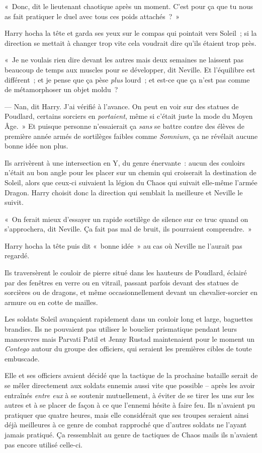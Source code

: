 «~Donc, dit le lieutenant chaotique après un moment. C'est pour ça que tu nous as fait pratiquer le duel avec tous ces poids attachés~?~»

Harry hocha la tête et garda ses yeux sur le compas qui pointait vers Soleil~; si la direction se mettait à changer trop vite cela voudrait dire qu'ils étaient trop près.

«~Je ne voulais rien dire devant les autres mais deux semaines ne laissent pas beaucoup de temps aux muscles pour se développer, dit Neville. Et l'équilibre est différent~; et je pense que ça pèse \emph{plus} lourd~; et est-ce que ça n'est pas comme de métamorphoser un objet moldu~?

--- Nan, dit Harry. J'ai vérifié à l'avance. On peut en voir sur des statues de Poudlard, certains sorciers en \emph{portaient}, même si c'était juste la mode du Moyen Âge.~» Et puisque personne n'essaierait ça \emph{sans} se battre contre des élèves de première année armés de sortilèges faibles comme \emph{Somnium}, ça ne révélait aucune bonne idée non plus.

Ils arrivèrent à une intersection en Y, du genre énervante~: aucun des couloirs n'était au bon angle pour les placer sur un chemin qui croiserait la destination de Soleil, alors que ceux-ci suivaient la légion du Chaos qui suivait elle-même l'armée Dragon. Harry choisit donc la direction qui semblait la meilleure et Neville le suivit.

«~On ferait mieux d'essayer un rapide sortilège de silence sur ce truc quand on s'approchera, dit Neville. Ça fait pas mal de bruit, ils pourraient comprendre.~»

Harry hocha la tête puis dit «~bonne idée~» au cas où Neville ne l'aurait pas regardé.

Ils traversèrent le couloir de pierre situé dans les hauteurs de Poudlard, éclairé par des fenêtres en verre ou en vitrail, passant parfois devant des statues de sorcières ou de dragons, et même occasionnellement devant un chevalier-sorcier en armure ou en cotte de mailles.

\later

Les soldats Soleil avançaient rapidement dans un couloir long et large, baguettes brandies. Ils ne pouvaient pas utiliser le bouclier prismatique pendant leurs manœuvres mais Parvati Patil et Jenny Rustad maintenaient pour le moment un \emph{Contego} autour du groupe des officiers, qui seraient les premières cibles de toute embuscade.

Elle et ses officiers avaient décidé que la tactique de la prochaine bataille serait de se mêler directement aux soldats ennemis aussi vite que possible -- après les avoir entraînés \emph{entre eux} à se soutenir mutuellement, à éviter de se tirer les uns sur les autres et à se placer de façon à ce que l'ennemi hésite à faire feu. Ils n'avaient pu pratiquer que quatre heures, mais elle considérait que ses troupes seraient ainsi déjà meilleures à ce genre de combat rapproché que d'autres soldats ne l'ayant jamais pratiqué. Ça ressemblait au genre de tactiques de Chaos mails ils n'avaient pas encore utilisé celle-ci.

